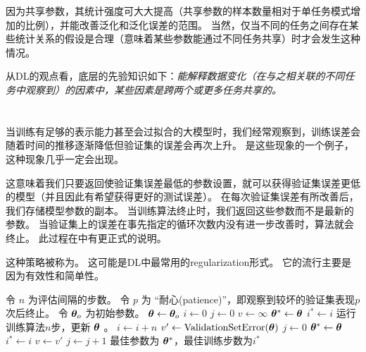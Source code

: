 因为共享参数，其统计强度可大大提高（共享参数的样本数量相对于单任务模式增加的比例），并能改善泛化和泛化误差的范围\citep{baxter95a}。
当然，仅当不同的任务之间存在某些统计关系的假设是合理（意味着某些参数能通过不同任务共享）时才会发生这种情况。

从\gls{DL}的观点看，底层的先验知识如下：\emph{能解释数据变化（在与之相关联的不同任务中观察到）的因素中，某些因素是跨两个或更多任务共享的。}


\section{}
\label{sec:early_stopping}
当训练有足够的表示能力甚至会过拟合的大模型时，我们经常观察到，训练误差会随着时间的推移逐渐降低但验证集的误差会再次上升。
是这些现象的一个例子，这种现象几乎一定会出现。


这意味着我们只要返回使验证集误差最低的参数设置，就可以获得验证集误差更低的模型（并且因此有希望获得更好的测试误差）。
在每次验证集误差有所改善后，我们存储模型参数的副本。
当训练算法终止时，我们返回这些参数而不是最新的参数。
当验证集上的误差在事先指定的循环次数内没有进一步改善时，算法就会终止。
此过程在中有更正式的说明。



这种策略被称为。
这可能是\gls{DL}中最常用的\gls{regularization}形式。
它的流行主要是因为有效性和简单性。

\begin{algorithm}[ht]
\caption{用于确定最佳训练时间量的\gls{early_stopping}元算法。
这种元算法是一种通用策略，可以很好地在各种训练算法和各种量化验证集误差的方法上工作。
}
\label{alg:early_stopping}
\begin{algorithmic}
\STATE 令 $n$ 为评估间隔的步数。
\STATE 令 $p$ 为 ``耐心(patience)''，即观察到较坏的验证集表现$p$次后终止。 
\STATE 令 $\boldsymbol{\theta}_{o}$ 为初始参数。
\STATE $\boldsymbol{\theta} \leftarrow \boldsymbol{\theta}_{o}$
\STATE $i \leftarrow 0$
\STATE $j \leftarrow 0$
\STATE $v \leftarrow \infty$
\STATE $\boldsymbol{\theta}^* \leftarrow \boldsymbol{\theta}$
\STATE $i^* \leftarrow i$
    \STATE 运行训练算法$n$步，更新 $\boldsymbol{\theta}$ 。
    \STATE $i \leftarrow i + n$
    \STATE $v' \leftarrow \text{ValidationSetError}(\boldsymbol{\theta})$
        \STATE $j \leftarrow 0$
        \STATE $\boldsymbol{\theta}^* \leftarrow \boldsymbol{\theta}$
        \STATE $i^* \leftarrow i$
        \STATE $v \leftarrow v'$
    \ELSE
        \STATE $j \leftarrow j + 1$
    \ENDIF
\ENDWHILE
\STATE 最佳参数为 $\boldsymbol{\theta}^*$，最佳训练步数为$i^*$
\end{algorithmic}
\end{algorithm}


